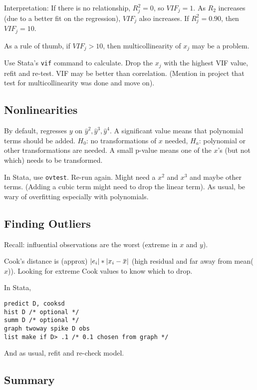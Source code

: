 \documentclass[11pt, oneside]{article}   	%
\newcommand{\overbar}[1]{\mkern 1.5mu\overline{\mkern-1.5mu#1\mkern-1.5mu}\mkern 1.5mu}
\begin{document}
Interpretation: If there is no relationship, $R^2_j = 0$, so $VIF_j=1$.  As $R_2$ increases (due to a better fit on the regression), $VIF_j$ also increases. If $R^2_j = 0.90$, then $VIF_j = 10$.  

As a rule of thumb, if $VIF_j > 10$, then multicollinearity of $x_j$ may be a problem.

Use Stata's \texttt{vif} command to calculate. Drop the $x_j$ with the highest VIF value, refit and re-test. VIF may be better than correlation. (Mention in project that test for multicollinearity was done and move on).

\subsection{Nonlinearities}

By default, regresses $y$ on $\hat{y}^2, \hat{y}^3, \hat{y}^4$. A significant value means that polynomial terms should be added. $H_0$: no transformations of $x$ needed, $H_a$: polynomial or other transformations are needed. A small p-value means one of the $x$'s (but not which) needs to be transformed.

In Stata, use \texttt{ovtest}. Re-run again. Might need a $x^2$ and $x^3$ and maybe other terms. (Adding a cubic term might need to drop the linear term). As usual, be wary of overfitting especially with polynomials.

\subsection{Finding Outliers}

Recall: influential observations are the worst (extreme in $x$ and $y$). 

Cook's distance is (approx) $|e_i| * |x_i - \overbar{x}|$ (high residual and far away from mean($x$)).  Looking for extreme Cook values to know which to drop.

In Stata,
\begin{verbatim}
predict D, cooksd
hist D /* optional */
summ D /* optional */
graph twoway spike D obs
list make if D> .1 /* 0.1 chosen from graph */
\end{verbatim}

And as usual, refit and re-check model.

\subsection{Summary}
\end{document}
